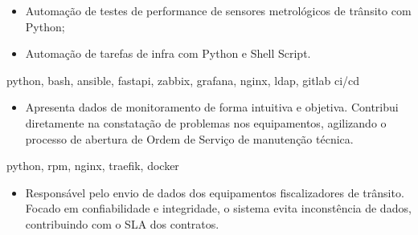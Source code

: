 \documentclass[10pt,a4paper]{altacv}
\begin{document}
\divider

\begin{itemize}
    \item Automação de testes de performance de sensores metrológicos de trânsito com Python;
    \item Automação de tarefas de infra com Python e Shell Script.
\end{itemize}


{\MakeLowercase{python, bash, ansible, fastapi, zabbix, grafana, nginx, LDAP, gitlab ci/cd}} {}{}
\begin{itemize}
    \item Apresenta dados de monitoramento de forma intuitiva e objetiva. Contribui diretamente na constatação de problemas nos equipamentos, agilizando o processo de abertura de Ordem de Serviço de manutenção técnica.
\end{itemize}
\divider



{\MakeLowercase{python, rpm, nginx, traefik, docker}}{}{}
\begin{itemize}
    \item Responsável pelo envio de dados dos equipamentos fiscalizadores de trânsito. Focado em confiabilidade e integridade, o sistema evita inconstência de dados, contribuindo com o SLA dos contratos.
\end{itemize}


\clearpage

\end{document}
